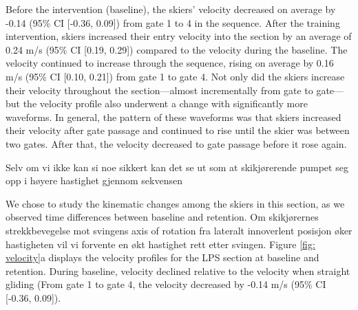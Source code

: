 \documentclass{article}
\begin{document}
Before the intervention (baseline), the skiers' velocity decreased on average by -0.14 (95\% CI [-0.36, 0.09]) from gate 1 to 4 in the sequence. After the training intervention, skiers increased their entry velocity into the section by an average of 0.24 m/s (95\% CI [0.19, 0.29]) compared to the velocity during the baseline. The velocity continued to increase through the sequence, rising on average by 0.16 m/s (95\% CI [0.10, 0.21]) from gate 1 to gate 4. Not only did the skiers increase their velocity throughout the section—almost incrementally from gate to gate—but the velocity profile also underwent a change with significantly more waveforms. In general, the pattern of these waveforms was that skiers increased their velocity after gate passage and continued to rise until the skier was between two gates. After that, the velocity decreased to gate passage before it rose again. 

Selv om vi ikke kan si noe sikkert kan det se ut som at skikjørerende pumpet seg opp i høyere hastighet gjennom sekvensen









































We chose to study the kinematic changes among the skiers in this section, as we observed time differences between baseline and retention. Om skikjørernes strekkbevegelse mot svingens axis of rotation fra lateralt innoverlent posisjon øker hastigheten vil vi forvente en økt hastighet rett etter svingen. Figure \ref{fig: velocity}a displays the velocity profiles for the LPS section at baseline and retention. During baseline, velocity declined relative to the velocity when straight gliding (From gate 1 to gate 4, the velocity decreased by -0.14 m/s (95\% CI [-0.36, 0.09]).
\end{document}
